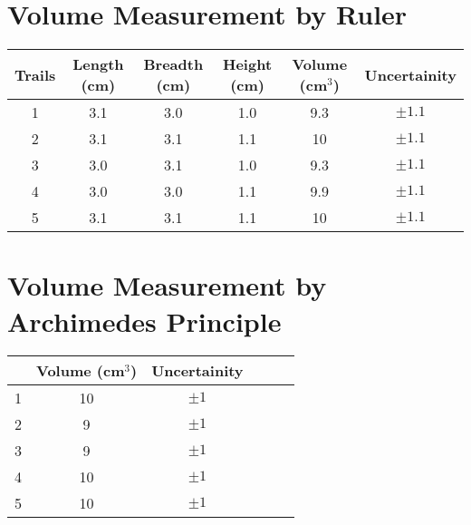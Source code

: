         
\section{{Volume Measurement by Ruler}}
        
    \begin{table}[H]
                \centering
                \begin{tabular}{|c|c|c|c|c|c|}
                \hline
                \hline
                {Trails} & {Length (cm)} & {Breadth (cm)} & {Height (cm)} & {Volume (cm$^3$)} & {Uncertainity} \\
                \hline
                \hline
                1 & 3.1 & 3.0 & 1.0 & 9.3 & $\pm 1.1$ \\
                \hline
                2 & 3.1 & 3.1 & 1.1 & 10 & $\pm 1.1$ \\
                \hline
                3 & 3.0 & 3.1 & 1.0 & 9.3 & $\pm 1.1$ \\
                \hline
                4 & 3.0 & 3.0 & 1.1 & 9.9 & $\pm 1.1$ \\
                \hline
                5 & 3.1 & 3.1 & 1.1 & 10 & $\pm 1.1$ \\
                \hline
                \hline
                \end{tabular}
                \label{}
    \end{table}
                
\section{{Volume Measurement by Archimedes Principle}}
        
    \begin{table}[H]
                \centering
                \begin{tabular}{|c|c|c|c|c|c|}
                \hline
                \hline
                {{Trails} & {Volume (cm$^3$)} & {Uncertainity} \\
                \hline
                \hline
                1 & 10 & $\pm 1$ \\
                \hline
                2 & 9 & $\pm 1$ \\
                \hline
                3 & 9 & $\pm 1$ \\
                \hline
                4 & 10 & $\pm 1$ \\
                \hline
                5 & 10 & $\pm 1$ \\
                \hline
                \hline
                \end{tabular}
                \label{}
    \end{table}



